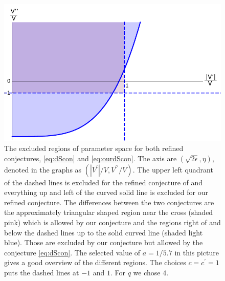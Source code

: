 \documentclass[a4paper,12pt]{report}
\begin{document}
\begin{figure}[htp]
     \centering
     \includegraphics[width=0.9 \textwidth]{conreg3_mod.pdf}
     \caption{The excluded regions of parameter space for both refined conjectures, \eqref{eq:dScon} and \eqref{eq:ourdScon}. The axis are $(\sqrt{2\epsilon},\eta)$, denoted in the graphs as $(|V^ \prime|/V,V^ {\prime \prime}/V)$. The upper left quadrant of the dashed lines is excluded for the refined conjecture of \cite{Ooguri:2018wrx} and everything up and left of the curved solid line is excluded for our refined conjecture. The differences between the two conjectures are the approximately triangular shaped region near the cross (shaded pink) which is allowed by our conjecture and the regions right of and below the dashed lines up to the solid curved line (shaded light blue). Those are excluded by our conjecture but allowed by the conjecture \eqref{eq:dScon}. The selected value of $a = 1/5.7$ in this picture gives a good overview of the different regions. The choices $c=c^ \prime = 1$ puts the dashed lines at $-1$ and $1$. For $q$ we chose $4$.}
     \label{fig:conjreg}
\end{figure}
\end{document}
